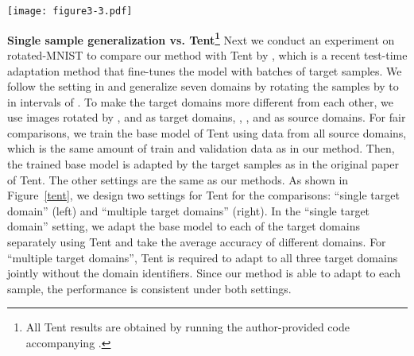 \documentclass{article} \usepackage[table]{xcolor}
\begin{document}
\begin{figure*}[t] 
\centering 
\centerline{\texttt{[image: figure3-3.pdf]}} 
\vspace{-2mm}
\caption{\textbf{Single sample generalization vs. Tent} \citep{wang2021tent} for different settings on rotated-MNIST.
Tent shows good performance with a large batch of samples from a single domain (left).
However, when provided only one sample or given samples from different domains without the domain id (right), Tent suffers.
More detailed comparisons are provided in Appendix~\ref{apptent}. 
} 
\label{tent}
\vspace{-4mm}
\end{figure*} 



\textbf{Single sample generalization vs. Tent\footnote{All Tent results are obtained by running the author-provided code accompanying  \citep{wang2021tent}.}}
Next we conduct an experiment on rotated-MNIST to compare our method with Tent by \cite{wang2021tent}, which is a recent test-time adaptation method that fine-tunes the model with batches of target samples. 
We follow the setting in \citep{piratla2020efficient} and generalize seven domains by rotating the samples by  to   in intervals of . 
To make the target domains more different from each other, we use images rotated by ,  and  as target domains,  , ,  and   as source domains.
For fair comparisons, we train the base model of Tent using data from all source domains, which is the same amount of train and validation data as in our method.
Then, the trained base model is adapted by the target samples as in the original paper of Tent. The other settings are the same as our methods.
As shown in Figure~\ref{tent}, we design two settings for Tent for the comparisons: ``single target domain'' (left) and ``multiple target domains'' (right). In the ``single target domain'' setting, we adapt the base model to each of the target domains separately using Tent and take the average accuracy of different domains. For ``multiple target domains'', Tent is required to adapt to all three target domains jointly without the domain identifiers. 
Since our method is able to adapt to each sample, the performance is consistent under both settings.
\end{document}
